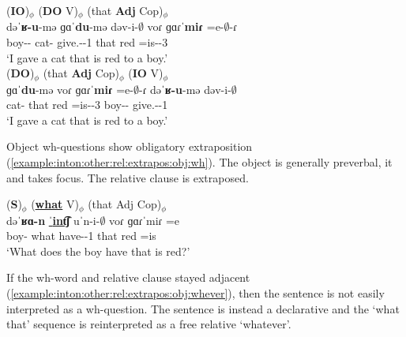 \begin{exe}
	\ex \begin{xlist}
		\ex \glll (\textbf{IO})$_\phi$ (\textbf{DO} V)$_\phi$ (that \textbf{Adj} Cop)$_\phi$  \\
		dəˈ\textbf{ʁ-u}-mə  ɡɑˈ\textbf{du}-mə dəv-i-$\emptyset$  voɾ ɡɑɾ\textbf{ˈmiɾ} =e-$\emptyset$-ɾ \\
		boy-{\dat}-{\indf}  cat-{\indf} give.{\aorperf}-{\pst}-1{\sg} that red =is-{\pst}-3{\sg} \\
		\trans `I gave a cat that is red to a boy.'
		\label{example:inton:other:rel:extrapos:ditrans:extrapos}
		\\ 
		\ex \glll (\textbf{DO})$_\phi$ (that \textbf{Adj} Cop)$_\phi$ (\textbf{IO} V)$_\phi$   \\
		ɡɑˈ\textbf{du}-mə   voɾ ɡɑɾ\textbf{ˈmiɾ} =e-$\emptyset$-ɾ  dəˈ\textbf{ʁ-u}-mə  dəv-i-$\emptyset$\\
		cat-{\indf} that red =is-{\pst}-3{\sg} boy-{\dat}-{\indf}   give.{\aorperf}-{\pst}-1{\sg}  \\
		\trans `I gave a cat that is red to a boy.'
		\label{example:inton:other:rel:extrapos:ditrans:reorder}
		\\ 
		
	\end{xlist}
\end{exe}


Object wh-questions show obligatory extraposition (\ref{example:inton:other:rel:extrapos:obj:wh}). The object is generally preverbal, it and takes focus. The relative clause is extraposed. 


\begin{exe}
	\ex \glll (\textbf{S})$_\phi$ (\underline{\textbf{what}} V)$_\phi$ (that {Adj} Cop)$_\phi$  \\
	dəˈ\textbf{ʁɑ-n}   \underline{ˈ\textbf{int͡ʃ}} uˈn-i-$\emptyset$  voɾ ɡɑɾ{ˈmiɾ} =e \\
	boy-{} what have-{\thgloss}-1{\sg} that red =is \\
	\trans `What does the boy have that is red?'
	\label{example:inton:other:rel:extrapos:obj:wh}
	\\ 
	
\end{exe}

If the wh-word and relative clause stayed adjacent (\ref{example:inton:other:rel:extrapos:obj:whever}), then the sentence is not easily interpreted as a wh-question. The sentence is instead a declarative and the `what that' sequence is reinterpreted as a free relative `whatever'. 


